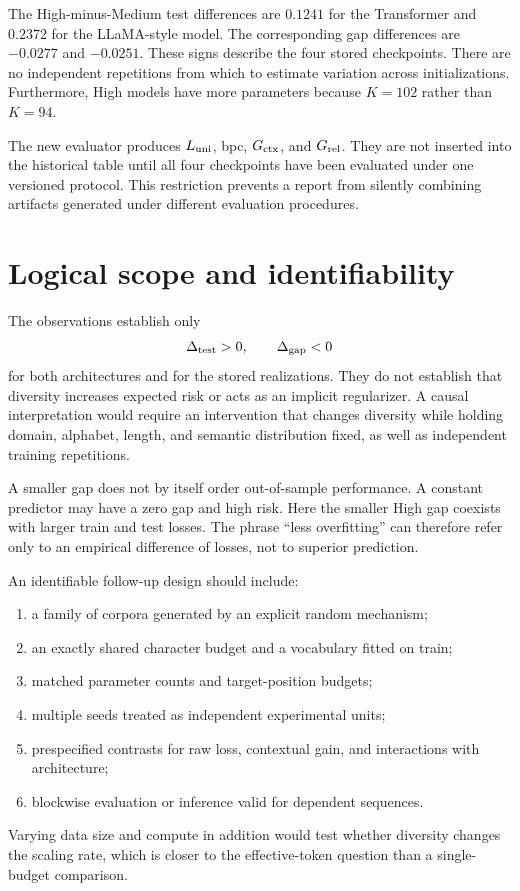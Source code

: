 \documentclass[11pt]{article}
\newcommand{\1}{\mathbf 1}
\begin{document}
The High-minus-Medium test differences are $0.1241$ for the Transformer and
$0.2372$ for the LLaMA-style model. The corresponding gap differences are
$-0.0277$ and $-0.0251$. These signs describe the four stored checkpoints.
There are no independent repetitions from which to estimate variation across
initializations. Furthermore, High models have more parameters because
$K=102$ rather than $K=94$.

The new evaluator produces $L_{\rm uni}$, bpc, $G_{\rm ctx}$, and
$G_{\rm rel}$. They are not inserted into the historical table until all four
checkpoints have been evaluated under one versioned protocol. This restriction
prevents a report from silently combining artifacts generated under different
evaluation procedures.

\section{Logical scope and identifiability}

The observations establish only
\[
 \Delta_{\rm test}>0,
 \qquad
 \Delta_{\rm gap}<0
\]
for both architectures and for the stored realizations. They do not establish
that diversity increases expected risk or acts as an implicit regularizer. A
causal interpretation would require an intervention that changes diversity
while holding domain, alphabet, length, and semantic distribution fixed, as
well as independent training repetitions.

A smaller gap does not by itself order out-of-sample performance. A constant
predictor may have a zero gap and high risk. Here the smaller High gap coexists
with larger train and test losses. The phrase ``less overfitting'' can therefore
refer only to an empirical difference of losses, not to superior prediction.

An identifiable follow-up design should include:
\begin{enumerate}
 \item a family of corpora generated by an explicit random mechanism;
 \item an exactly shared character budget and a vocabulary fitted on train;
 \item matched parameter counts and target-position budgets;
 \item multiple seeds treated as independent experimental units;
 \item prespecified contrasts for raw loss, contextual gain, and interactions
       with architecture;
 \item blockwise evaluation or inference valid for dependent sequences.
\end{enumerate}
Varying data size and compute in addition would test whether diversity changes
the scaling rate, which is closer to the effective-token question than a
single-budget comparison.
\end{document}
